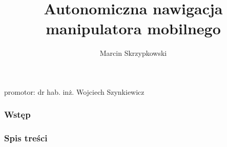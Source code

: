 \documentclass[aspectratio=169,11pt]{beamer}
\author{Marcin Skrzypkowski}
\title{Autonomiczna nawigacja manipulatora mobilnego}
\begin{document}
{
\begin{frame}
\titlepage
	\begin{center}
		promotor: dr hab. inż. Wojciech Szynkiewicz
	\end{center}
\end{frame}
}

{
\begin{frame}
\frametitle{Wstęp}
	\begin{figure}[!tbp]
		\centering
  	\hfill
	\end{figure}
\end{frame}
}

{
\begin{frame}
\frametitle{Spis treści}
	\begin{multicols}{2}
		\tableofcontents
	\end{multicols}
\end{frame}
}
\end{document}
